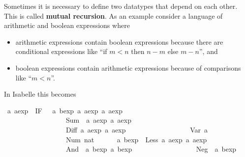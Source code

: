 %
\begin{isabellebody}%
\def\isabellecontext{ABexpr}%
%
\isadelimtheory
%
\endisadelimtheory
%
\isatagtheory
%
\endisatagtheory
{\isafoldtheory}%
%
\isadelimtheory
%
\endisadelimtheory
%
\begin{isamarkuptext}%
%
Sometimes it is necessary to define two datatypes that depend on each
other. This is called \textbf{mutual recursion}. As an example consider a
language of arithmetic and boolean expressions where
\begin{itemize}
\item arithmetic expressions contain boolean expressions because there are
  conditional expressions like ``if $m<n$ then $n-m$ else $m-n$'',
  and
\item boolean expressions contain arithmetic expressions because of
  comparisons like ``$m<n$''.
\end{itemize}
In Isabelle this becomes%
\end{isamarkuptext}%
\isamarkuptrue%
\isamarkupfalse%
\ {\isacharprime}a\ aexp\ {\isacharequal}\ IF\ \ \ {\isachardoublequoteopen}{\isacharprime}a\ bexp{\isachardoublequoteclose}\ {\isachardoublequoteopen}{\isacharprime}a\ aexp{\isachardoublequoteclose}\ {\isachardoublequoteopen}{\isacharprime}a\ aexp{\isachardoublequoteclose}\isanewline
\ \ \ \ \ \ \ \ \ \ \ \ \ \ \ \ \ {\isacharbar}\ Sum\ \ {\isachardoublequoteopen}{\isacharprime}a\ aexp{\isachardoublequoteclose}\ {\isachardoublequoteopen}{\isacharprime}a\ aexp{\isachardoublequoteclose}\isanewline
\ \ \ \ \ \ \ \ \ \ \ \ \ \ \ \ \ {\isacharbar}\ Diff\ {\isachardoublequoteopen}{\isacharprime}a\ aexp{\isachardoublequoteclose}\ {\isachardoublequoteopen}{\isacharprime}a\ aexp{\isachardoublequoteclose}\isanewline
\ \ \ \ \ \ \ \ \ \ \ \ \ \ \ \ \ {\isacharbar}\ Var\ {\isacharprime}a\isanewline
\ \ \ \ \ \ \ \ \ \ \ \ \ \ \ \ \ {\isacharbar}\ Num\ nat\isanewline
{}\ \ \ \ \ \ {\isacharprime}a\ bexp\ {\isacharequal}\ Less\ {\isachardoublequoteopen}{\isacharprime}a\ aexp{\isachardoublequoteclose}\ {\isachardoublequoteopen}{\isacharprime}a\ aexp{\isachardoublequoteclose}\isanewline
\ \ \ \ \ \ \ \ \ \ \ \ \ \ \ \ \ {\isacharbar}\ And\ \ {\isachardoublequoteopen}{\isacharprime}a\ bexp{\isachardoublequoteclose}\ {\isachardoublequoteopen}{\isacharprime}a\ bexp{\isachardoublequoteclose}\isanewline
\ \ \ \ \ \ \ \ \ \ \ \ \ \ \ \ \ {\isacharbar}\ Neg\ \ {\isachardoublequoteopen}{\isacharprime}a\ bexp{\isachardoublequoteclose}%
\begin{isamarkuptext}%

\end{isamarkuptext}
\end{isabellebody}
